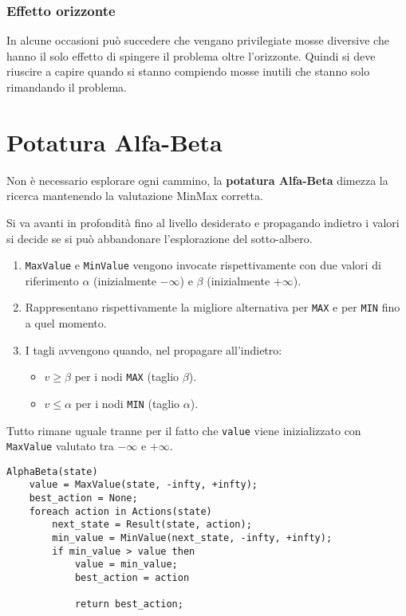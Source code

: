 \subsubsection{Effetto orizzonte}
In alcune occasioni pu\`o succedere che vengano privilegiate mosse diversive che hanno il solo effetto di spingere il
problema oltre l'orizzonte. Quindi si deve riuscire a capire quando si stanno compiendo mosse inutili che stanno solo
rimandando il problema.

\section{Potatura Alfa-Beta}
Non \`e necessario esplorare ogni cammino, la \textbf{potatura Alfa-Beta} dimezza la ricerca mantenendo la valutazione
MinMax corretta.

Si va avanti in profondit\`a fino al livello desiderato e propagando indietro i valori si
decide se si pu\`o abbandonare l'esplorazione del sotto-albero.
\begin{enumerate}
	\item \verb|MaxValue| e \verb|MinValue| vengono invocate rispettivamente con due valori di riferimento $\alpha$
	      (inizialmente $-\infty$) e $\beta$ (inizialmente $+\infty$).
	\item Rappresentano rispettivamente la migliore alternativa per \verb|MAX| e per \verb|MIN| fino a quel momento.
	\item I tagli avvengono quando, nel propagare all'indietro:
	      \begin{itemize}
		      \item $v \geq \beta$ per i nodi \verb|MAX| (taglio $\beta$).
		      \item $v \leq \alpha$ per i nodi \verb|MIN| (taglio $\alpha$).
	      \end{itemize}
\end{enumerate}
Tutto rimane uguale tranne per il fatto che \verb|value| viene inizializzato con \verb|MaxValue| valutato
tra $-\infty$ e $+\infty$.
\begin{lstlisting}[style=pseudo-style]
AlphaBeta(state)
	value = MaxValue(state, -infty, +infty);
	best_action = None;
	foreach action in Actions(state)
		next_state = Result(state, action);
		min_value = MinValue(next_state, -infty, +infty);
		if min_value > value then
			value = min_value;
			best_action = action
	
			return best_action;
\end{lstlisting}

